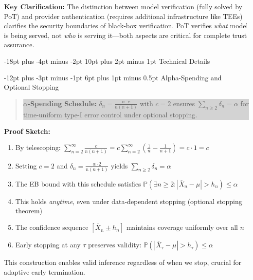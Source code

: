 \documentclass[11pt]{article}
\makeatletter
\renewcommand\section{\@startsection{section}{1}{\z@}%
  {-18pt plus -4pt minus -2pt}%
  {10pt plus 2pt minus 1pt}%
  {\normalfont\Large\bfseries}}
\renewcommand\subsection{\@startsection{subsection}{2}{\z@}%
  {-12pt plus -3pt minus -1pt}%
  {6pt plus 1pt minus 0.5pt}%
  {\normalfont\large\bfseries}}
\makeatother
\begin{document}
\textbf{Key Clarification:} The distinction between model verification (fully solved by PoT) and provider authentication (requires additional infrastructure like TEEs) clarifies the security boundaries of black-box verification. PoT verifies \emph{what} model is being served, not \emph{who} is serving it---both aspects are critical for complete trust assurance.



\appendix

\section{Technical Details}

\subsection{Alpha-Spending and Optional Stopping}

\begin{quote}
\colorbox{lightgray}{\parbox{0.95\textwidth}{
\textbf{$\alpha$-Spending Schedule:} $\delta_n = \frac{\alpha \cdot c}{n(n+1)}$ with $c=2$ ensures $\sum_{n \geq 2} \delta_n = \alpha$ for time-uniform type-I error control under optional stopping.
}}
\end{quote}

\textbf{Proof Sketch:}
\begin{enumerate}
\item By telescoping: $\sum_{n=2}^{\infty} \frac{c}{n(n+1)} = c \sum_{n=2}^{\infty} \left(\frac{1}{n} - \frac{1}{n+1}\right) = c \cdot 1 = c$
\item Setting $c=2$ and $\delta_n = \frac{\alpha \cdot 2}{n(n+1)}$ yields $\sum_{n \geq 2} \delta_n = \alpha$
\item The EB bound with this schedule satisfies $\mathbb{P}(\exists n \geq 2: |\overline{X}_n - \mu| > h_n) \leq \alpha$
\item This holds \emph{anytime}, even under data-dependent stopping (optional stopping theorem)
\item The confidence sequence $[\overline{X}_n \pm h_n]$ maintains coverage uniformly over all $n$
\item Early stopping at any $\tau$ preserves validity: $\mathbb{P}(|\overline{X}_\tau - \mu| > h_\tau) \leq \alpha$
\end{enumerate}

This construction enables valid inference regardless of when we stop, crucial for adaptive early termination.
\end{document}
